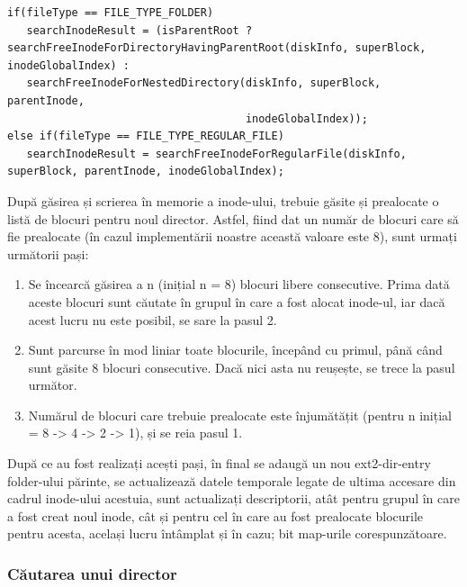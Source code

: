 \bigskip

\lstset{style=code-snyppet-style}
\begin{lstlisting}
if(fileType == FILE_TYPE_FOLDER)
   searchInodeResult = (isParentRoot ? searchFreeInodeForDirectoryHavingParentRoot(diskInfo, superBlock,                                                   inodeGlobalIndex) :
   searchFreeInodeForNestedDirectory(diskInfo, superBlock, parentInode,                             
                                     inodeGlobalIndex));
else if(fileType == FILE_TYPE_REGULAR_FILE)
   searchInodeResult = searchFreeInodeForRegularFile(diskInfo, superBlock, parentInode, inodeGlobalIndex);
\end{lstlisting}

\bigskip

După găsirea și scrierea în memorie a inode-ului, trebuie găsite și prealocate o listă de blocuri pentru noul director. Astfel, fiind dat un număr de blocuri care să fie prealocate (în cazul implementării noastre această valoare este 8), sunt urmați următorii pași:

  \begin{enumerate}
      \item Se încearcă găsirea a n (inițial n = 8) blocuri libere consecutive. Prima dată aceste blocuri sunt căutate în grupul în care a fost alocat inode-ul, iar dacă acest lucru nu este posibil, se sare la pasul 2.
      
      \item Sunt parcurse în mod liniar toate blocurile, începând cu primul, până când sunt găsite 8 blocuri consecutive. Dacă nici asta nu reușește, se trece la pasul următor.

      \item Numărul de blocuri care trebuie prealocate este înjumătățit (pentru n inițial = 8 -> 4 -> 2 -> 1), și se reia pasul 1.
  \end{enumerate}

După ce au fost realizați acești pași, în final se adaugă un nou ext2-dir-entry folder-ului părinte, se actualizează datele temporale legate de ultima accesare din cadrul inode-ului acestuia, sunt actualizați descriptorii, atât pentru grupul în care a fost creat noul inode, cât și pentru cel în care au fost prealocate blocurile pentru acesta, același lucru întâmplat și în cazu; bit map-urile corespunzătoare.

\subsubsection{Căutarea unui director}

